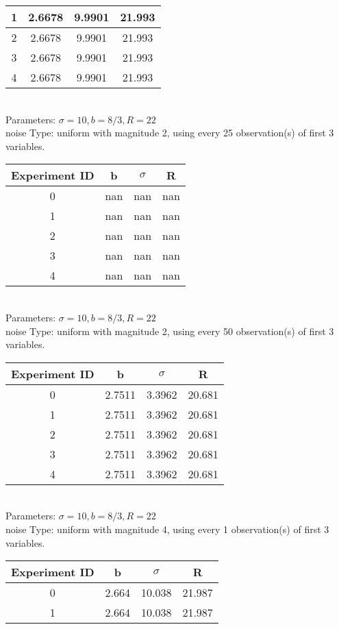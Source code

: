 \begin{multicols}{3}
\begin{tabular}{cccc}
 1 & 2.6678 & 9.9901 & 21.993\\ \hline 
 2 & 2.6678 & 9.9901 & 21.993\\ \hline 
 3 & 2.6678 & 9.9901 & 21.993\\ \hline 
 4 & 2.6678 & 9.9901 & 21.993\\ \hline 
 \end{tabular}\\
Parameters: $\sigma=10, b=8/3, R=22$\\
noise Type: uniform with magnitude 2, using every 25 observation(s) of first 3 variables.\\
\begin{tabular}{cccc}
\hline Experiment ID & b & $\sigma$ & R \\ \hline 
0 & nan & nan & nan\\ \hline 
 1 & nan & nan & nan\\ \hline 
 2 & nan & nan & nan\\ \hline 
 3 & nan & nan & nan\\ \hline 
 4 & nan & nan & nan\\ \hline 
 \end{tabular}\\
Parameters: $\sigma=10, b=8/3, R=22$\\
noise Type: uniform with magnitude 2, using every 50 observation(s) of first 3 variables.\\
\begin{tabular}{cccc}
\hline Experiment ID & b & $\sigma$ & R \\ \hline 
0 & 2.7511 & 3.3962 & 20.681\\ \hline 
 1 & 2.7511 & 3.3962 & 20.681\\ \hline 
 2 & 2.7511 & 3.3962 & 20.681\\ \hline 
 3 & 2.7511 & 3.3962 & 20.681\\ \hline 
 4 & 2.7511 & 3.3962 & 20.681\\ \hline 
 \end{tabular}\\
Parameters: $\sigma=10, b=8/3, R=22$\\
noise Type: uniform with magnitude 4, using every 1 observation(s) of first 3 variables.\\
\begin{tabular}{cccc}
\hline Experiment ID & b & $\sigma$ & R \\ \hline 
0 & 2.664 & 10.038 & 21.987\\ \hline 
 1 & 2.664 & 10.038 & 21.987\\ \hline 

\end{tabular}
\end{multicols}
